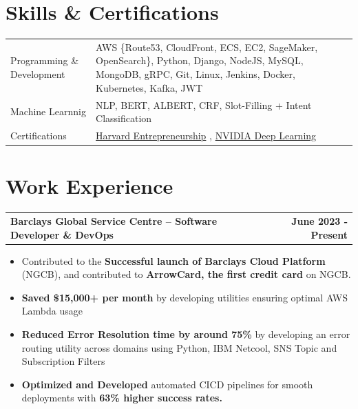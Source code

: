 \documentclass[letterpaper,12pt]{article}
\makeatletter
\newenvironment{joblong}[2]
    {
    \begin{tabularx}{\linewidth}{@{}l X r@{}}
    \textbf{#1} & \hfill &  #2 \\[3.75pt]
    \end{tabularx}
    \begin{minipage}[t]{\linewidth}
    \begin{itemize}[nosep,after=\strut, leftmargin=1em, itemsep=3pt,label=--]
    }
    {
    \end{itemize}
    \end{minipage}    
    }
\makeatother
\begin{document}
\section{Skills \& Certifications}
\begin{tabularx}{\linewidth}{@{}l X@{}}
Programming \& Development &  \normalsize{AWS \{Route53, CloudFront, ECS, EC2, SageMaker, OpenSearch\}, Python, Django, NodeJS, MySQL, MongoDB, gRPC, Git, Linux, Jenkins, Docker, Kubernetes, Kafka, JWT}\\
Machine Learnnig &  \normalsize{NLP, BERT, ALBERT, CRF, Slot-Filling + Intent Classification}\\  
Certifications & \normalsize{\href{https://courses.edx.org/certificates/09ce93111ee34656b2351006a9a4ebad}{Harvard Entrepreneurship} , \href{https://learn.nvidia.com/certificates?id=0dfcf9b3a87143c59605f8179bd6ebb8}{NVIDIA Deep Learning}}
\end{tabularx}


\vspace{-5pt}
\section{Work Experience}
\vspace{-5pt}
\begin{joblong}{Barclays Global Service Centre -- Software Developer \& DevOps}{\textbf{June 2023 - Present}}
\item Contributed to the \textbf{Successful launch of Barclays Cloud Platform} (NGCB), and contributed to \textbf{ArrowCard, the first credit card} on NGCB.
\item \textbf{Saved \$15,000+ per month} by developing utilities ensuring optimal AWS Lambda usage
\item \textbf{Reduced Error Resolution time by around 75\%} by developing an error routing utility across domains using Python, IBM Netcool, SNS Topic and Subscription Filters
\item \textbf{Optimized and Developed} automated CICD pipelines for smooth deployments with \textbf{63\% higher success rates.}
\end{joblong}
\end{document}
